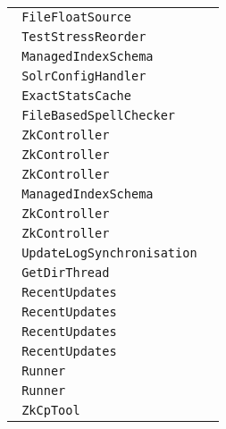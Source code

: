 \begin{center}
\begin{tabular}{ll}
\lstinline/ FileFloatSource/&\raisebox{0pt}{\lstinline/   getFloats(FileFloatSource,IndexReader)/}\\ 
\lstinline/ TestStressReorder/&\raisebox{0pt}{\lstinline/   run()/}\\ 
\lstinline/ ManagedIndexSchema/&\raisebox{0pt}{\lstinline/   newFieldType(String,String)/}\\ 
\lstinline/ SolrConfigHandler/&\raisebox{0pt}{\lstinline/   waitForAllReplicasState()/}\\ 
\lstinline/ ExactStatsCache/&\raisebox{0pt}{\lstinline/   returnLocalStats(ResponseBuild)/}\\ 
\lstinline/ FileBasedSpellChecker/&\raisebox{0pt}{\lstinline/   loadExternalFileDictionary(SolrCore)/}\\ 
\lstinline/ ZkController/&\raisebox{0pt}{\lstinline/   publishNodeAsDown(String)/}\\ 
\lstinline/ ZkController/&\raisebox{0pt}{\lstinline/   publishNodeAsDown(String)/}\\ 
\lstinline/ ZkController/&\raisebox{0pt}{\lstinline/   publishNodeAsDown(String)/}\\ 
\lstinline/ ManagedIndexSchema/&\raisebox{0pt}{\lstinline/  enewFieldType(String,String,Map<String,?>)/}\\ 
\lstinline/ ZkController/&\raisebox{0pt}{\lstinline/   publishNodeAsDown(String)/}\\ 
\lstinline/ ZkController/&\raisebox{0pt}{\lstinline/   publishNodeAsDown(String)/}\\ 
\lstinline/ UpdateLogSynchronisation/&\raisebox{0pt}{\lstinline/   run()/}\\ 
\lstinline/ GetDirThread/&\raisebox{0pt}{\lstinline/   run()/}\\ 
\lstinline/ RecentUpdates/&\raisebox{0pt}{\lstinline/   update()/}\\ 
\lstinline/ RecentUpdates/&\raisebox{0pt}{\lstinline/   update()/}\\ 
\lstinline/ RecentUpdates/&\raisebox{0pt}{\lstinline/   update()/}\\ 
\lstinline/ RecentUpdates/&\raisebox{0pt}{\lstinline/   update()/}\\ 
\lstinline/ Runner/&\raisebox{0pt}{\lstinline/   resetTaskWithException(OverseerMessageHandler)/}\\ 
\lstinline/ Runner/&\raisebox{0pt}{\lstinline/   resetTaskWithException(OverseerMessageHandler)/}\\ 
\lstinline/ ZkCpTool/&\raisebox{0pt}{\lstinline/   runImpl(CommandLine)/}\\ 

\end{tabular}
\end{center}
